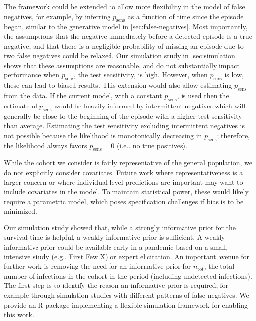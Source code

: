 \documentclass[referee,useAMS,usenatbib]{biom}
\makeatletter
\newcommand{\psens}{p_\text{sens}}
\newcommand{\ntot}{n_\text{tot}}
\DeclareRobustCommand\onedot{\futurelet\@let@token\@onedot}
\def\@onedot{\ifx\@let@token.\else.\null\fi\xspace}
\def\eg{e.g\onedot} \def\Eg{{E.g}\onedot}
\def\ie{i.e\onedot} \def\Ie{{I.e}\onedot}
\makeatother
\begin{document}
The framework could be extended to allow more flexibility in the model of false negatives, for example, by inferring $\psens$ as a function of time since the episode began, similar to the generative model in \cref{sec:false-negatives}.
Most importantly, the assumptions that the negative immediately before a detected episode is a true negative, and that there is a negligible probability of missing an episode due to two false negatives could be relaxed.
Our simulation study in \cref{sec:simulation} shows that these assumptions are reasonable, and do not substantially impact performance when $\psens$, the test sensitivity, is high.
However, when $\psens$ is low, these can lead to biased results.
This extension would also allow estimating $\psens$ from the data.
If the current model, with a constant $\psens$, is used then the estimate of $\psens$ would be heavily informed by intermittent negatives which will generally be close to the beginning of the episode with a higher test sensitivity than average.
Estimating the test sensitivity excluding intermittent negatives is not possible because the likelihood is monotonically decreasing in $\psens$; therefore, the likelihood always favors $\psens = 0$ (\ie no true positives).

While the cohort we consider is fairly representative of the general population, we do not explicitly consider covariates.
Future work where representativeness is a larger concern or where individual-level predictions are important may want to include covariates in the model.
To maintain statistical power, these would likely require a parametric model, which poses specification challenges if bias is to be minimized.

Our simulation study showed that, while a strongly informative prior for the survival time is helpful, a weakly informative prior is sufficient.
A weakly informative prior could be available early in a pandemic based on a small, intensive study (\eg First Few X) or expert elicitation.
An important avenue for further work is removing the need for an informative prior for $\ntot$, the total number of infections in the cohort in the period (including undetected infections).
The first step is to identify the reason an informative prior is required, for example through simulation studies with different patterns of false negatives.
We provide an R package implementing a flexible simulation framework for enabling this work.
\end{document}
